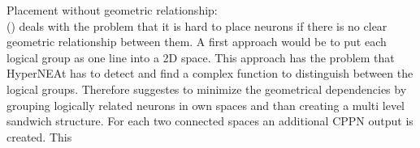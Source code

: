 Placement without geometric relationship:\\
  (\cite{HyperNEATUnknownGeometry}) deals with the problem that it is hard to place neurons if there is no clear geometric relationship between them. A first approach would be to put each logical group as one line into a 2D space. This approach has the problem that HyperNEAt has to detect and find a complex function to distinguish between the logical groups. Therefore \cite{HyperNEATUnknownGeometry} suggestes to minimize the geometrical dependencies by grouping logically related neurons in own spaces and than creating a multi level sandwich structure. For each two connected spaces an additional CPPN output is created. This 